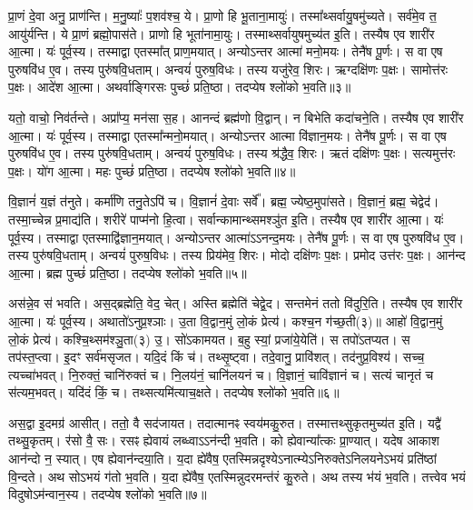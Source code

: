 प्रा॒णं दे॒वा अनु॒ प्राण॑न्ति। 
म॒नु॒ष्याः᳚ प॒शव॑श्च॒ ये। 
प्रा॒णो हि भू॒ताना॒मायुः॑। 
तस्मा᳚थ्सर्वायु॒षमु॑च्यते। 
सर्व॑मे॒व त॒ आयु॑र्\mbox{}यन्ति। 
ये प्रा॒णं ब्रह्मो॒पास॑ते। 
प्राणो हि भूता॑नामा॒युः। 
तस्माथ्सर्वायुषमुच्य॑त इ॒ति। 
तस्यैष एव शारी॑र आ॒त्मा। 
यः॑ पूर्व॒स्य। 
तस्माद्वा एतस्मा᳚त् प्राण॒मयात्। 
अन्योऽन्तर आत्मा॑ मनो॒मयः। 
तेनै॑ष पू॒र्णः। 
स वा एष पुरुषवि॑ध ए॒व। 
तस्य पुरु॑षवि॒धताम्। 
अन्वयं॑ पुरुष॒विधः। 
तस्य यजु॑रेव॒ शिरः। 
ऋग्दक्षि॑णः प॒क्षः। 
सामोत्त॑रः प॒क्षः। 
आदे॑श आ॒त्मा। 
अथर्वाङ्गिरसः पुच्छं॑ प्रति\-॒ष्ठा। 
तदप्येष श्लो॑को भ॒वति॥३॥

यतो॒ वाचो॒ निव॑र्तन्ते। 
अप्रा᳚प्य॒ मन॑सा स॒ह। 
आनन्दं ब्रह्म॑णो वि॒द्वान्। 
न बिभेति कदा॑चने॒ति। 
तस्यैष एव शारी॑र आ॒त्मा। 
यः॑ पूर्व॒स्य। 
तस्माद्वा एतस्मा᳚न्मनो॒मयात्। 
अन्योऽन्तर आत्मा वि॑ज्ञान॒मयः। 
तेनै॑ष पू॒र्णः। 
स वा एष पुरुषवि॑ध ए॒व। 
तस्य पुरु॑षवि॒धताम्। 
अन्वयं॑ पुरुष॒विधः। 
तस्य श्र॑द्धैव॒ शिरः। 
ऋतं दक्षि॑णः प॒क्षः। 
सत्यमुत्त॑रः प॒क्षः। 
यो॑ग आ॒त्मा। 
महः पुच्छं॑ प्रति\-॒ष्ठा। 
तदप्येष श्लो॑को भ॒वति॥४॥

वि॒ज्ञानं॑ य॒ज्ञं त॑नुते। 
कर्मा॑णि तनु॒तेऽपि॑ च। 
वि॒ज्ञानं॑ दे॒वाः सर्वे᳚। 
ब्रह्म॒ ज्येष्ठ॒मुपा॑सते। 
वि॒ज्ञानं॒ ब्रह्म॒ चेद्वेद॑। 
तस्मा॒च्चेन्न प्र॒माद्य॑ति। 
शरीरे॑ पाप्म॑नो हि॒त्वा। 
सर्वान्कामान्थ्समश्ञु॑त इ॒ति। 
तस्यैष एव शारी॑र आ॒त्मा। 
यः॑ पूर्व॒स्य। 
तस्माद्वा एतस्माद्वि॑ज्ञान॒मयात्। 
अन्योऽन्तर आत्मा॑ऽऽनन्द॒मयः। 
तेनै॑ष पू॒र्णः। 
स वा एष पुरुषवि॑ध ए॒व। 
तस्य पुरु॑षवि॒धताम्। 
अन्वयं॑ पुरुष॒विधः। 
तस्य प्रिय॑मेव॒ शिरः। 
मोदो दक्षि॑णः प॒क्षः। 
प्रमोद उत्त॑रः प॒क्षः। 
आन॑न्द आ॒त्मा। 
ब्रह्म पुच्छं॑ प्रति\-॒ष्ठा। 
तदप्येष श्लो॑को भ॒वति॥५॥

अस॑न्ने॒व स॑ भवति। 
अस॒द्ब्रह्मेति॒ वेद॒ चेत्। 
अस्ति ब्रह्मेति॑ चेद्वे॒द। 
सन्तमेनं ततो वि॑दुरि॒ति। 
तस्यैष एव शारी॑र आ॒त्मा। 
यः॑ पूर्व॒स्य। 
अथातो॑ऽनुप्र॒श्ञाः। 
उ॒ता वि॒द्वान॒मुं लो॒कं प्रेत्य॑। 
कश्च॒न ग॑च्छ॒ती(३)॥ आहो॑ वि॒द्वान॒मुं लो॒कं प्रेत्य॑। 
कश्चि॒थ्सम॑श्ञु॒ता(३) उ॒। 
सो॑ऽकामयत। 
ब॒हु स्यां॒ प्रजा॑ये॒येति॑। 
स तपो॑ऽतप्यत। 
स तप॑स्त॒प्त्वा। 
इ॒दꣳ सर्व॑मसृजत। 
यदि॒दं किं च॑। 
तथ्सृ॒ष्ट्वा। 
तदे॒वानु॒ प्रावि॑शत्। 
तद॑नुप्र॒विश्य॑। 
सच्च॒ त्यच्चा॑भवत्। 
नि॒रुक्तं॒ चानि॑रुक्तं च। 
नि॒लय॑नं॒ चानि॑लयनं च। 
वि॒ज्ञानं॒ चावि॑ज्ञानं च। 
सत्यं चानृतं च स॑त्यम॒भवत्। 
यदि॑दं किं॒ च। 
तथ्सत्यमि॑त्याच॒क्षते। 
तदप्येष श्लो॑को भ॒वति॥६॥

अस॒द्वा इ॒दमग्र॑ आसीत्। 
ततो॒ वै सद॑जायत। 
तदात्मानꣴ स्वय॑मकु॒रुत। 
तस्मात्तथ्सुकृतमुच्य॑त इ॒ति। 
यद्वै॑ तथ्सु॒कृतम्। 
र॑सो वै॒ सः। 
रसꣴ ह्येवायं लब्ध्वाऽऽन॑न्दी भ॒वति। 
को ह्येवान्या᳚त्कः प्रा॒ण्यात्। 
यदेष आकाश आन॑न्दो न॒ स्यात्। 
एष ह्येवान॑न्दया॒ति। 
य॒दा ह्ये॑वैष॒ एतस्मिन्नदृश्येऽनात्म्येऽनिरुक्तेऽनिलयनेऽभयं प्रति॑\-ष्ठां वि॒न्दते। 
अथ सोऽभयं ग॑तो भ॒वति। 
य॒दा ह्ये॑वैष॒ एतस्मिन्नुदरमन्त॑रं कु॒रुते। 
अथ तस्य भ॑यं भ॒वति। 
तत्त्वेव भयं विदुषोऽम॑न्वान॒स्य। 
तदप्येष श्लो॑को भ॒वति॥७॥

